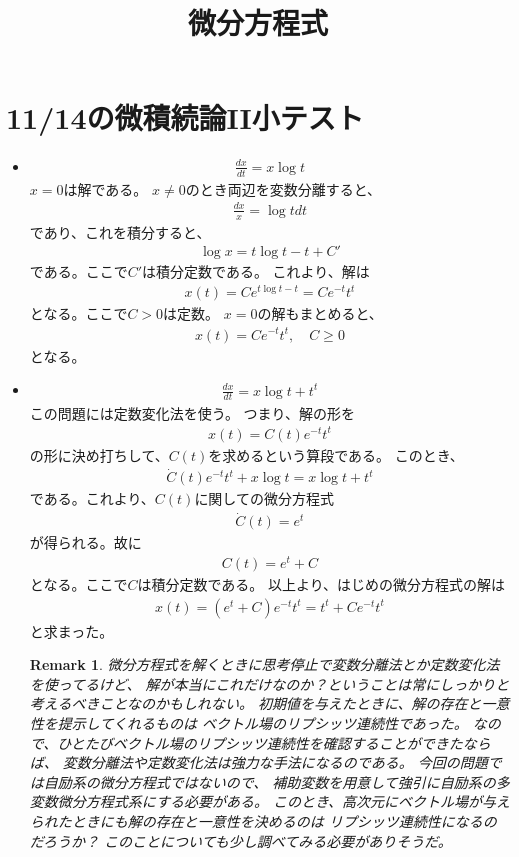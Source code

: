 \documentclass{jsarticle}
\newtheorem{remark}{Remark}
\begin{document}
\title{微分方程式}
\maketitle
\section{11/14の微積続論II小テスト}
\begin{itemize}
\item 
\begin{align}
\frac{dx}{dt}=x\log t
\end{align}
$x=0$は解である。
$x\ne 0$のとき両辺を変数分離すると、
\begin{align}
\frac{dx}{x}=\log tdt
\end{align}
であり、これを積分すると、
\begin{align}
\log x=t\log t-t+C'
\end{align}
である。ここで$C'$は積分定数である。
これより、解は
\begin{align}
x(t)=Ce^{t\log t-t}=Ce^{-t}t^{t}
\end{align}
となる。ここで$C>0$は定数。
$x=0$の解もまとめると、
\begin{align}
x(t)=Ce^{-t}t^{t},\quad C\geq 0
\end{align}
となる。
\item
\begin{align}
\frac{dx}{dt}=x\log t+t^{t}
\end{align}
この問題には定数変化法を使う。
つまり、解の形を
\begin{align}
x(t)=C(t)e^{-t}t^{t}
\end{align}
の形に決め打ちして、$C(t)$を求めるという算段である。
このとき、
\begin{align}
\dot{C}(t)e^{-t}t^{t}+x\log t=x\log t+t^{t}
\end{align}
である。これより、$C(t)$に関しての微分方程式
\begin{align}
\dot{C}(t)=e^{t}
\end{align}
が得られる。故に
\begin{align}
C(t)=e^{t}+C
\end{align}
となる。ここで$C$は積分定数である。
以上より、はじめの微分方程式の解は
\begin{align}
x(t)=(e^{t}+C)e^{-t}t^{t}=t^{t}+Ce^{-t}t^{t}
\end{align}
と求まった。

\begin{remark}
微分方程式を解くときに思考停止で変数分離法とか定数変化法を使ってるけど、
解が本当にこれだけなのか？ということは常にしっかりと考えるべきことなのかもしれない。
初期値を与えたときに、解の存在と一意性を提示してくれるものは
ベクトル場のリプシッツ連続性であった。
なので、ひとたびベクトル場のリプシッツ連続性を確認することができたならば、
変数分離法や定数変化法は強力な手法になるのである。
今回の問題では自励系の微分方程式ではないので、
補助変数を用意して強引に自励系の多変数微分方程式系にする必要がある。
このとき、高次元にベクトル場が与えられたときにも解の存在と一意性を決めるのは
リプシッツ連続性になるのだろうか？
このことについても少し調べてみる必要がありそうだ。
\end{remark}

\end{itemize}
\end{document}
